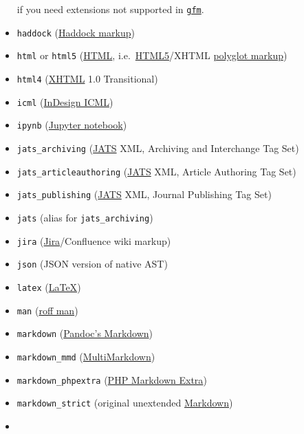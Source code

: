 \documentclass[]{article}
\begin{document}
\begin{description}
\begin{itemize}
  if you need extensions not supported in
  \protect\hyperlink{markdown-variants}{\texttt{gfm}}.
\item
  \texttt{haddock}
  (\href{https://www.haskell.org/haddock/doc/html/ch03s08.html}{Haddock
  markup})
\item
  \texttt{html} or \texttt{html5}
  (\href{https://www.w3.org/html/}{HTML},
  i.e.~\href{https://html.spec.whatwg.org/}{HTML5}/XHTML
  \href{https://www.w3.org/TR/html-polyglot/}{polyglot markup})
\item
  \texttt{html4} (\href{https://www.w3.org/TR/xhtml1/}{XHTML} 1.0
  Transitional)
\item
  \texttt{icml}
  (\href{https://wwwimages.adobe.com/www.adobe.com/content/dam/acom/en/devnet/indesign/sdk/cs6/idml/idml-cookbook.pdf}{InDesign
  ICML})
\item
  \texttt{ipynb}
  (\href{https://nbformat.readthedocs.io/en/latest/}{Jupyter notebook})
\item
  \texttt{jats\_archiving} (\href{https://jats.nlm.nih.gov}{JATS} XML,
  Archiving and Interchange Tag Set)
\item
  \texttt{jats\_articleauthoring} (\href{https://jats.nlm.nih.gov}{JATS}
  XML, Article Authoring Tag Set)
\item
  \texttt{jats\_publishing} (\href{https://jats.nlm.nih.gov}{JATS} XML,
  Journal Publishing Tag Set)
\item
  \texttt{jats} (alias for \texttt{jats\_archiving})
\item
  \texttt{jira}
  (\href{https://jira.atlassian.com/secure/WikiRendererHelpAction.jspa?section=all}{Jira}/Confluence
  wiki markup)
\item
  \texttt{json} (JSON version of native AST)
\item
  \texttt{latex} (\href{https://www.latex-project.org/}{LaTeX})
\item
  \texttt{man} (\href{https://man.cx/groff_man(7)}{roff man})
\item
  \texttt{markdown} (\protect\hyperlink{pandocs-markdown}{Pandoc's
  Markdown})
\item
  \texttt{markdown\_mmd}
  (\href{https://fletcherpenney.net/multimarkdown/}{MultiMarkdown})
\item
  \texttt{markdown\_phpextra}
  (\href{https://michelf.ca/projects/php-markdown/extra/}{PHP Markdown
  Extra})
\item
  \texttt{markdown\_strict} (original unextended
  \href{https://daringfireball.net/projects/markdown/}{Markdown})
\item

\end{itemize}
\end{description}
\end{document}
